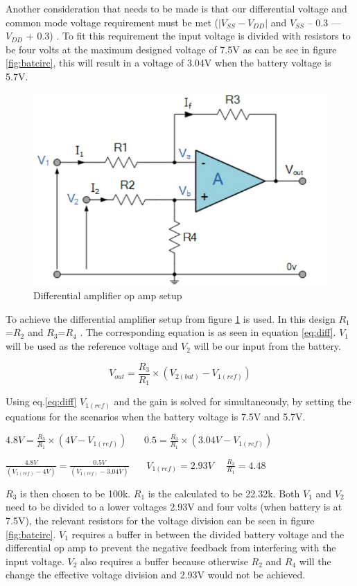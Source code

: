 Another consideration that needs to be made is that our differential voltage and common mode voltage requirement must be met ($|V_{SS}-V_{DD}|$ and  $V_{SS}$ – 0.3 — $V_{DD}$ + 0.3) \cite{MCP}. To fit this requirement the input voltage is divided with resistors to be  four volts at the maximum designed voltage of 7.5V  as can be see in figure \ref{fig:batcirc}, this will result in a voltage of 3.04V when the battery voltage is 5.7V.

\begin{figure}[!htb]
	\centering
	\includegraphics[width=0.27\linewidth]{Figures/A6/difamp.jpg}
	\caption[Differential amplifier op amp setup]{Differential amplifier op amp setup\cite{difAmp} }
	\label{fig:difamp}
\end{figure}

To achieve the differential amplifier setup from figure \ref{fig:difamp} is used. In this design $R_1$=$R_2$ and $R_3$=$R_4$ \cite{difAmp}. The corresponding equation is as seen in equation \ref{eq:diff}.  $V_1$ will be used as the reference voltage and $V_2$ will be our input from the battery.

\begin{equation}
	V_{out}=\frac{R_3}{R_1}\times(V_{2(bat)}-V_{1(ref)}) 
	\label{eq:diff}
\end{equation}

Using eq.\ref{eq:diff} $V_{1(ref)}$ and the gain is solved for simultaneously, by setting the equations for the scenarios when the battery voltage is 7.5V and 5.7V.

\begin{center}
	 $4.8V=\frac{R_3}{R_1}\times(4V-V_{1(ref)}) \ \ \ \ \ \ \ \ 0.5=\frac{R_3}{R_1}\times(3.04V-V_{1(ref)}) $\newline 
	
	$\frac{4.8V}{(V_{1(ref)}-4V)}=\frac{0.5V}{(V_{1(ref)}-3.04V)}  \ \ \ \ \ \ \ \ V_{1(ref)}=2.93V \ \ \ \ \ \ \frac{R_3}{R_1}=4.48$\newline
\end{center}


$R_3$ is then chosen to be 100k\textohm. $R_1$ is the calculated to be 22.32k\textohm. Both $V_1$ and $V_2$ need to be divided to a lower voltages 2.93V and four volts (when battery is at 7.5V), the relevant resistors for the voltage division can be seen in figure \ref{fig:batcirc}.  $V_1$ requires a buffer in between the divided battery voltage and the differential op amp to prevent the negative feedback from interfering with the input voltage. $V_2$ also requires a buffer because otherwise $R_2$ and $R_4$ will the change the effective voltage division and 2.93V would not be achieved. 

